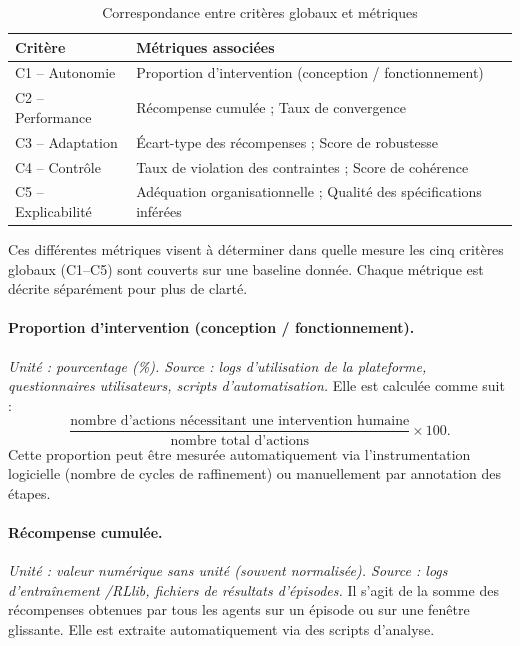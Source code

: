 \begin{table}[h!]
  \centering
  \caption{Correspondance entre critères globaux et métriques}
  \begin{tabular}{ll}
    \hline
    \textbf{Critère}   & \textbf{Métriques associées}                                       \\
    \hline
    C1 – Autonomie     & Proportion d'intervention (conception / fonctionnement)            \\
    C2 – Performance   & Récompense cumulée ; Taux de convergence                           \\
    C3 – Adaptation    & Écart-type des récompenses ; Score de robustesse                   \\
    C4 – Contrôle      & Taux de violation des contraintes ; Score de cohérence             \\
    C5 – Explicabilité & Adéquation organisationnelle ; Qualité des spécifications inférées \\
    \hline
  \end{tabular}
  \label{tab:grille}
\end{table}

Ces différentes métriques visent à déterminer dans quelle mesure les cinq critères globaux (C1--C5) sont couverts sur une baseline donnée.
Chaque métrique est décrite séparément pour plus de clarté.

\paragraph{Proportion d'intervention (conception / fonctionnement).}
\textit{Unité : pourcentage (\%). Source : logs d'utilisation de la plateforme, questionnaires utilisateurs, scripts d'automatisation.}
Elle est calculée comme suit :
\[
  \frac{\text{nombre d'actions nécessitant une intervention humaine}}{\text{nombre total d'actions}} \times 100.
\]
Cette proportion peut être mesurée automatiquement via l'instrumentation logicielle (nombre de cycles de raffinement) ou manuellement par annotation des étapes.

\paragraph{Récompense cumulée.}
\textit{Unité : valeur numérique sans unité (souvent normalisée). Source : logs d'entraînement /RLlib, fichiers de résultats d'épisodes.}
Il s'agit de la somme des récompenses obtenues par tous les agents sur un épisode ou sur une fenêtre glissante.
Elle est extraite automatiquement via des scripts d'analyse.

